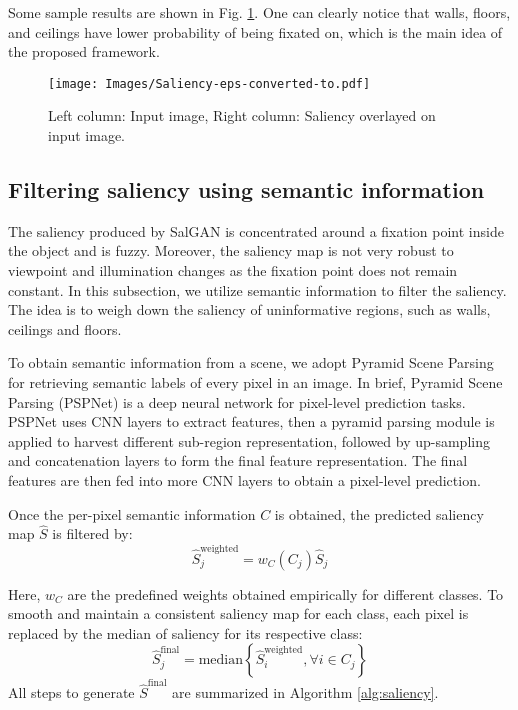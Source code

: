 \documentclass[letterpaper, 10 pt, conference]{ieeeconf}  %
\begin{document}
Some sample results are shown in Fig. \ref{fig:Saliency}. One can clearly notice that walls, floors, and ceilings have lower probability of being fixated on, which is the main idea of the proposed framework.

\begin{figure}[t!]
    \centering
    \texttt{[image: Images/Saliency-eps-converted-to.pdf]}
    \caption{Left column: Input image, Right column: Saliency overlayed on input image.}
    \label{fig:Saliency}
\end{figure}


\subsection{Filtering saliency using semantic information}
The saliency produced by SalGAN is concentrated around a fixation point inside the object and is fuzzy. Moreover, the saliency map is not very robust to viewpoint and illumination changes as the fixation point does not remain constant. In this subsection, we utilize semantic information to filter the saliency. The idea is to weigh down the saliency of uninformative regions, such as walls, ceilings and floors.

To obtain semantic information from a scene, we adopt Pyramid Scene Parsing \cite{PSP} for retrieving semantic labels of every pixel in an image. In brief,  Pyramid Scene Parsing (PSPNet) is a deep neural network for pixel-level prediction tasks. PSPNet uses CNN layers to extract features, then a pyramid parsing module is applied to harvest different sub-region representation, followed by up-sampling and concatenation layers to form the final feature representation. The final features are then fed into more CNN layers to obtain a pixel-level prediction.

Once the per-pixel semantic information $C$ is obtained, the predicted saliency map $\hat{S}$ is filtered by:
\begin{equation}
    \hat{S}^{\text{weighted}}_{j} = w_{C}(C_{j})\hat{S}_{j}
\end{equation}

Here, $w_{C}$ are the predefined weights obtained empirically for different classes. To smooth and maintain a consistent saliency map for each class, each pixel is replaced by the median of saliency for its respective class:
\begin{equation}
    \hat{S}^{\text{final}}_{j} = \text{median}\left \{ \hat{S}^{\text{weighted}}_{i}, \forall i \in C_{j} \right \}
\end{equation}
All steps to generate $\hat{S}^{\text{final}}$ are summarized in Algorithm \ref{alg:saliency}.
\end{document}
